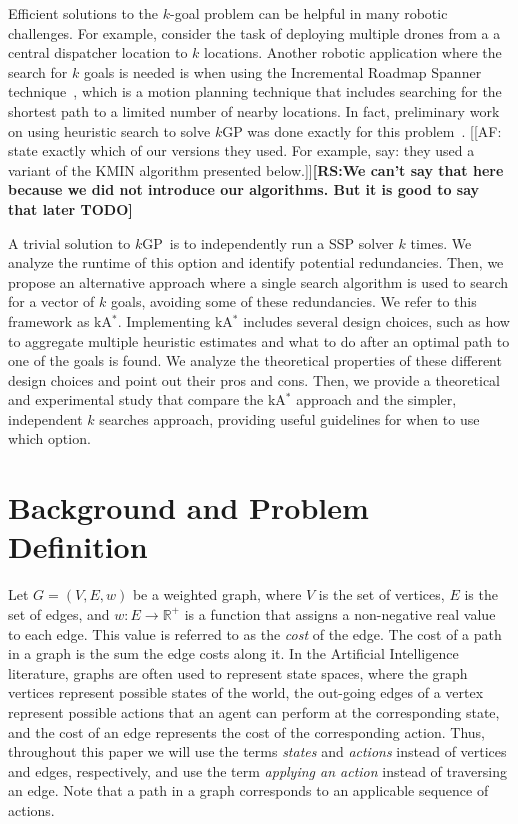 \documentclass{aicom2e}
\newcommand{\kgs}{$k$GP}
\newcommand{\kastar}{kA$^*$}
\newcommand{\roni}[1]{\textbf{[RS:#1]}}
\begin{document}
Efficient solutions to the $k$-goal problem can be helpful in many robotic
challenges. For example, consider the task of deploying multiple drones from a
a central dispatcher location to $k$ locations. Another robotic application
where the search for $k$ goals is needed is when using the Incremental Roadmap
Spanner technique~\cite{marble2013asymptotically}, which is a motion planning
technique that includes searching for the shortest path to a limited number of
nearby locations. In fact, preliminary work on using heuristic search to solve
\kgs{} was done exactly for this problem~\cite{DobsonB14}. [[AF: state exactly
which of our versions they used. For example, say: they used a variant of the
KMIN algorithm presented below.]]\roni{We can't say that here because we did not introduce our algorithms. 
But it is good to say that later TODO}

A trivial solution to \kgs\ is to independently run a SSP solver $k$ times. We
analyze the runtime of this option and identify potential redundancies. Then,
we propose an alternative approach where a single search algorithm is used to
search for a vector of $k$ goals, avoiding some of these redundancies. We refer
to this framework as \kastar{}. Implementing \kastar{} includes several design
choices, such as how to aggregate multiple heuristic estimates and what to do
after an optimal path to one of the goals is found. We analyze the theoretical
properties of these different design choices and point out their pros and cons.
Then, we provide a theoretical and experimental study that compare the
\kastar{} approach and the simpler, independent $k$ searches approach,
providing useful guidelines for when to use which option.


\section{Background and Problem Definition}



Let $G=(V,E,w)$ be a weighted graph, where $V$ is the set of vertices, $E$ is
the set of edges, and $w:E\rightarrow \mathbb{R}^+$ is a function that assigns
a non-negative real value to each edge. This value is referred to as the {\em
cost} of the edge. The cost of a path in a graph is the sum the edge costs
along it. In the Artificial Intelligence literature, graphs are often used to
represent state spaces, where the graph vertices represent possible states of
the world, the out-going edges of a vertex represent possible actions that an
agent can perform at the corresponding state, and the cost of an edge
represents the cost of the corresponding action. Thus, throughout this paper we
will use the terms {\em states} and {\em actions} instead of vertices and
edges, respectively, and use the term {\em applying an action} instead of
traversing an edge. Note that a path in a graph corresponds to an applicable
sequence of actions.
\end{document}
